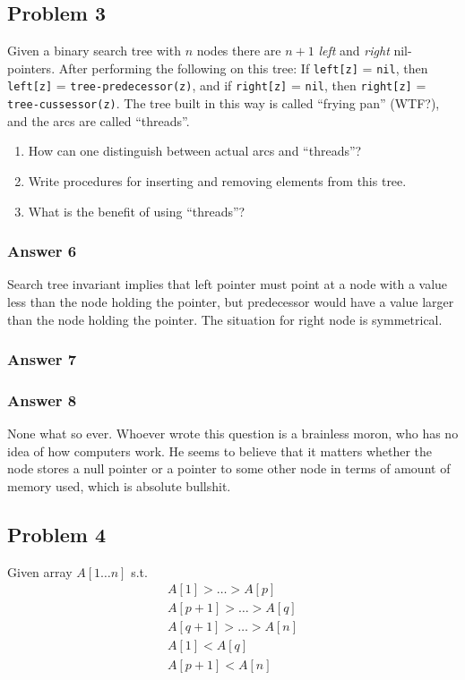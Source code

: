 \documentclass[11pt]{article}
\begin{document}
\subsection{Problem 3}
\label{sec-1-3}
Given a binary search tree with $n$ nodes there are $n + 1$ \emph{left} and
\emph{right} nil-pointers.  After performing the following on this tree: If
\texttt{left[z]} = \texttt{nil}, then \texttt{left[z]} = \texttt{tree-predecessor(z)}, and if \texttt{right[z]}
= \texttt{nil}, then \texttt{right[z]} = \texttt{tree-cussessor(z)}.  The tree built in this way
is called ``frying pan'' (WTF?), and the arcs are called ``threads''.
\begin{enumerate}
\item How can one distinguish between actual arcs and ``threads''?
\item Write procedures for inserting and removing elements from this tree.
\item What is the benefit of using ``threads''?
\end{enumerate}

\subsubsection{Answer 6}
\label{sec-1-3-1}
Search tree invariant implies that left pointer must point at a node with
a value less than the node holding the pointer, but predecessor would have
a value larger than the node holding the pointer.  The situation for right
node is symmetrical.

\subsubsection{Answer 7}
\label{sec-1-3-2}

\subsubsection{Answer 8}
\label{sec-1-3-3}
None what so ever.  Whoever wrote this question is a brainless moron, who
has no idea of how computers work.  He seems to believe that it matters
whether the node stores a null pointer or a pointer to some other node in
terms of amount of memory used, which is absolute bullshit.

\subsection{Problem 4}
\label{sec-1-4}
Given array $A[1\dots n]$ s.t. 
\begin{align*}
  A[1] > \dots > A[p] \\
  A[p + 1] > \dots > A[q] \\
  A[q + 1] > \dots > A[n] \\
  A[1] < A[q] \\
  A[p + 1] < A[n]
\end{align*}
\end{document}

